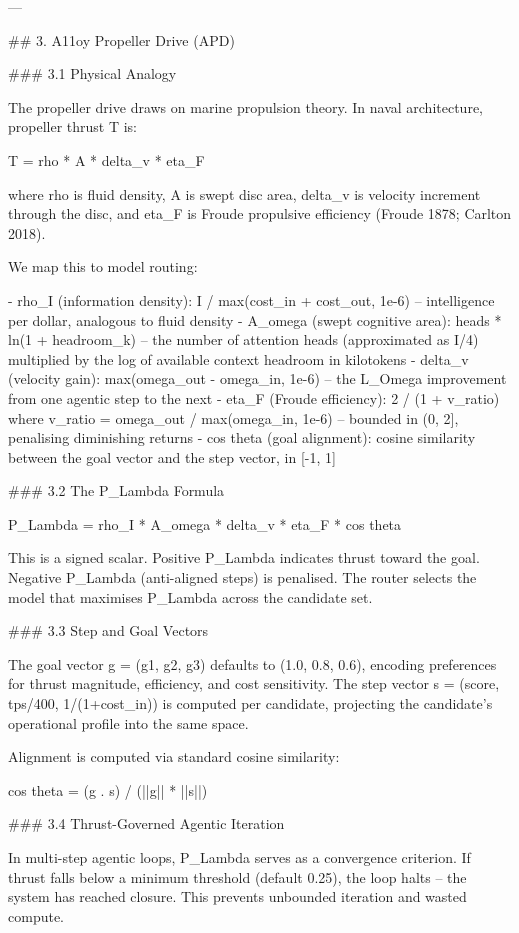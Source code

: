 ---

## 3. A11oy Propeller Drive (APD)

### 3.1 Physical Analogy

The propeller drive draws on marine propulsion theory. In naval architecture, propeller thrust T is:

T = rho * A * delta_v * eta_F

where rho is fluid density, A is swept disc area, delta_v is velocity increment through the disc, and eta_F is Froude propulsive efficiency (Froude 1878; Carlton 2018).

We map this to model routing:

- rho_I (information density): I / max(cost_in + cost_out, 1e-6) -- intelligence per dollar, analogous to fluid density
- A_omega (swept cognitive area): heads * ln(1 + headroom_k) -- the number of attention heads (approximated as I/4) multiplied by the log of available context headroom in kilotokens
- delta_v (velocity gain): max(omega_out - omega_in, 1e-6) -- the L_Omega improvement from one agentic step to the next
- eta_F (Froude efficiency): 2 / (1 + v_ratio) where v_ratio = omega_out / max(omega_in, 1e-6) -- bounded in (0, 2], penalising diminishing returns
- cos theta (goal alignment): cosine similarity between the goal vector and the step vector, in [-1, 1]

### 3.2 The P_Lambda Formula

P_Lambda = rho_I * A_omega * delta_v * eta_F * cos theta

This is a signed scalar. Positive P_Lambda indicates thrust toward the goal. Negative P_Lambda (anti-aligned steps) is penalised. The router selects the model that maximises P_Lambda across the candidate set.

### 3.3 Step and Goal Vectors

The goal vector g = (g1, g2, g3) defaults to (1.0, 0.8, 0.6), encoding preferences for thrust magnitude, efficiency, and cost sensitivity. The step vector s = (score, tps/400, 1/(1+cost_in)) is computed per candidate, projecting the candidate's operational profile into the same space.

Alignment is computed via standard cosine similarity:

cos theta = (g . s) / (||g|| * ||s||)

### 3.4 Thrust-Governed Agentic Iteration

In multi-step agentic loops, P_Lambda serves as a convergence criterion. If thrust falls below a minimum threshold (default 0.25), the loop halts -- the system has reached closure. This prevents unbounded iteration and wasted compute.


